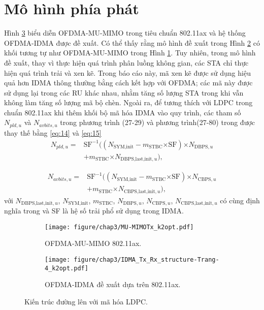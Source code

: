 \section{Mô hình phía phát}

Hình \ref{fig:Transmitter} biểu diễn OFDMA-MU-MIMO trong tiêu chuẩn 802.11ax và hệ thống OFDMA-IDMA được đề xuất. Có thể thấy rằng mô hình đề xuất trong Hình \ref{fig:Proposed_OFDMA-IDMA} có khối tương tự như OFDMA-MU-MIMO trong Hình \ref{fig:Old-OFDMA-MU-MIMO}. Tuy nhiên, trong mô hình đề xuất, thay vì thực hiện quá trình phân luồng không gian, các STA chỉ thực hiện quá trình trải và xen kẽ.
Trong báo cáo này, mã xen kẽ được sử dụng hiệu quả hơn IDMA thông thường bằng cách kết hợp với OFDMA; các mã này được sử dụng lại trong các RU khác nhau, nhằm tăng số lượng STA trong khi vẫn không làm tăng số lượng mã bộ chèn.
Ngoài ra, để tương thích với LDPC trong chuẩn 802.11ax khi thêm khối bộ mã hóa IDMA vào quy trình, các tham số $N_{pld,u}$ và $N_{avbits,u}$ trong phương trình (27-29) và phương trình(27-80) trong \cite{IEEEStd} được thay thế bằng \eqref{eq:14} và \eqref{eq:15}
\begin{equation}
	\begin{split}
		N_{pld,u} = &{\text{SF}}^{-1}((N_{\text{SYM,init}}-m_{\text{STBC}} \mathord{\times} \text{SF}) \mathord{\times} N_{\text{DBPS},u} \\
		&+ m_{\text{STBC}} \mathord{\times} N_{\text{DBPS,last,init},u}),
	\end{split}
	\label{eq:14}
\end{equation}

\begin{equation}
	\begin{split}
		N_{avbits,u} = &{\text{SF}}^{-1}((N_{\text{SYM,init}}-m_{\text{STBC}} \mathord{\times} \text{SF}) \mathord{\times} N_{\text{CBPS},u} \\
		&+ m_{\text{STBC}} \mathord{\times} N_{\text{CBPS,last,init},u}),
	\end{split}
	\label{eq:15}
\end{equation}
với $N_{\text{DBPS,last,init},u}$, $N_\text{SYM,init}$, $m_{\text{STBC}}$, $N_{\text{DBPS}, u}$, $N_{\text{CBPS},u}$, $N_{\text{CBPS,last,init},u}$ có cùng định nghĩa trong \cite{IEEEStd} và SF là hệ số trải phổ sử dụng trong IDMA.
\begin{figure}
	\centering
	\begin{subfigure}{0.49\linewidth}
		\centering
		\texttt{[image: figure/chap3/MU-MIMOTx\_k2opt.pdf]}
		\caption{OFDMA-MU-MIMO 802.11ax.}
		\label{fig:Old-OFDMA-MU-MIMO}
	\end{subfigure}
	\vspace{1em}
	\begin{subfigure}{0.49\linewidth}
		\centering
		\texttt{[image: figure/chap3/IDMA\_Tx\_Rx\_structure-Trang-4\_k2opt.pdf]}
		\caption{OFDMA-IDMA đề xuất dựa trên 802.11ax.}
		\label{fig:Proposed_OFDMA-IDMA}
	\end{subfigure}

	\caption{Kiến trúc đường lên với mã hóa LDPC.}
	\label{fig:Transmitter}
\end{figure}
